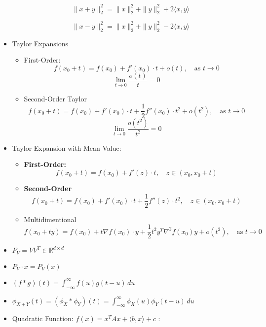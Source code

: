 \documentclass{article}
\begin{document}
\begin{itemize}
\[ \|x + y\|_2^2 = \|x\|_2^2 + \|y\|_2^2 + 2 \langle x, y \rangle \]

\[ \|x - y\|_2^2 = \|x\|_2^2 + \|y\|_2^2 - 2 \langle x, y \rangle \]


\item Taylor Expansions
\begin{itemize}

\item First-Order:
\[
f(x_0 + t) = f(x_0) + f'(x_0) \cdot t + o(t), \quad \text{as } t \to 0
\]
\[
\lim_{t \to 0} \frac{o(t)}{t} = 0
\]

\item Second-Order Taylor
   \[
        f(x_0 + t) = f(x_0) + f'(x_0) \cdot t + \frac{1}{2} f''(x_0) \cdot t^2 + o(t^2), \quad \text{as } t \to 0
        \]
    \[
        \lim_{t \to 0} \frac{o(t^2)}{t^2} = 0
        \]
\end{itemize}

\item Taylor Expansion with Mean Value:
\begin{itemize}
    \item \textbf{First-Order:}
    \[
    f(x_0 + t) = f(x_0) + f'(z) \cdot t, \quad z \in (x_0, x_0 + t)
    \]

    \item \textbf{Second-Order }
    \[
    f(x_0 + t) = f(x_0) + f'(x_0) \cdot t + \frac{1}{2} f''(z) \cdot t^2, \quad z \in (x_0, x_0 + t)
    \]

    \item Multidimentional 
\[
f(x_0 + ty) = f(x_0) + t \nabla f(x_0) \cdot y + \frac{1}{2} t^2 y^T \nabla^2 f(x_0) y + o(t^2), \quad \text{as } t \to 0
\]



\end{itemize}

\item  $
    P_V = V V^T \in \mathbb{R}^{d \times d}
    $
\item   $
    P_V \cdot x = P_V(x)
    $
\item $
(f * g)(t) = \int_{-\infty}^{\infty} f(u)g(t - u) \, du
$

\item $
\phi_{X+Y}(t) = \left( \phi_X * \phi_Y \right)(t) = \int_{-\infty}^{\infty} \phi_X(u)\phi_Y(t - u) \, du
$



\item Quadratic Function: $
f(x) = x^T A x + \langle b, x \rangle + c
$ :


\end{itemize}
\end{document}
